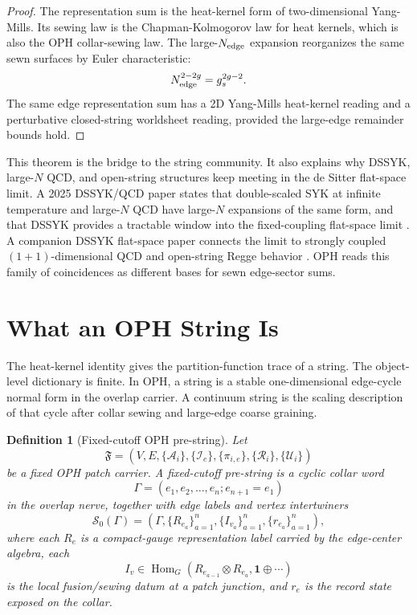 \documentclass[11pt]{article}
\newtheorem{definition}[theorem]{Definition}
\theoremstyle{remark}
\theoremstyle{plain}
\newcommand{\calA}{\mathcal A}
\newcommand{\calR}{\mathcal R}
\newcommand{\calI}{\mathcal I}
\newcommand{\calU}{\mathcal U}
\begin{document}
\begin{proof}
The representation sum is the heat-kernel form of two-dimensional Yang-Mills. Its sewing law is the
Chapman-Kolmogorov law for heat kernels, which is also the OPH collar-sewing law. The
large-\(N_{\rm edge}\) expansion reorganizes the same sewn surfaces by Euler characteristic:
\[
N_{\rm edge}^{2-2g}=g_s^{2g-2}.
\]
The same edge representation sum has a 2D Yang-Mills heat-kernel reading and a perturbative
closed-string worldsheet reading, provided the large-edge remainder bounds hold.
\end{proof}

This theorem is the bridge to the string community. It also explains why DSSYK, large-\(N\) QCD,
and open-string structures keep meeting in the de Sitter flat-space limit. A 2025 DSSYK/QCD paper
states that double-scaled SYK at infinite temperature and large-\(N\) QCD have large-\(N\)
expansions of the same form, and that DSSYK provides a tractable window into the fixed-coupling
flat-space limit \cite{DSSYKQCDPaper}. A companion DSSYK flat-space paper connects the limit to
strongly coupled \((1+1)\)-dimensional QCD and open-string Regge behavior \cite{DSSYKFlatPaper}.
OPH reads this family of coincidences as different bases for sewn edge-sector sums.


\section{What an OPH String Is}\label{sec:oph-string-object}

The heat-kernel identity gives the partition-function trace of a string. The object-level
dictionary is finite. In OPH, a string is a stable one-dimensional edge-cycle normal form in the
overlap carrier. A continuum string is the scaling description of that cycle after collar sewing
and large-edge coarse graining.

\begin{definition}[Fixed-cutoff OPH pre-string]
Let
\[
\mathfrak F=(V,E,\{\calA_i\},\{\calI_e\},\{\pi_{i,e}\},\{\calR_i\},\{\calU_i\})
\]
be a fixed OPH patch carrier. A fixed-cutoff pre-string is a cyclic collar word
\[
\Gamma=(e_1,e_2,\ldots,e_n;e_{n+1}=e_1)
\]
in the overlap nerve, together with edge labels and vertex intertwiners
\[
\mathcal S_0(\Gamma)=
\left(\Gamma,\{R_{e_a}\}_{a=1}^n,\{I_{v_a}\}_{a=1}^n,\{r_{e_a}\}_{a=1}^n\right),
\]
where each \(R_e\) is a compact-gauge representation label carried by the edge-center algebra,
each
\[
I_v\in\operatorname{Hom}_G(R_{e_{a-1}}\otimes R_{e_a},\mathbf 1\oplus\cdots)
\]
is the local fusion/sewing datum at a patch junction, and \(r_e\) is the record state exposed on
the collar.
\end{definition}
\end{document}
